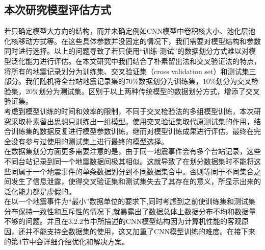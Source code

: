 \subsection{本次研究模型评估方式}
\indent 若只确定模型大方向的结构，而并未确定例如CNN模型中卷积核大小、池化层池化核移动方式等。在这些具体参数并没固定的情况下，我们需要对模型结构和参数同时进行选择。以上的问题导致了若只使用“训练-测试”的数据划分方式难以对模型泛化能力进行评估。在本文研究中我们结合了朴素留出法和交叉验证法的特点，将所有的地震记录划分为训练集、交叉验证集（cross validation set）和测试集三部分。我们随机将全台站地震记录集的70\%数据划分为训练集，10\%划分为交叉检验集，20\%划分为测试集。区别于以上两种传统模型的数据划分方式，增添了交叉验证集。\\
\indent 考虑到模型训练的时间和效率的限制，不同于交叉检验法的多组模型训练，本次研究采取朴素留出思想只训练出一组模型。使用交叉验证集取代原测试集的作用，结合训练集的数据反复进行模型参数训练，继而对模型训练成果进行评估，最终在完全没有参与过使用的测试集上进行最终的模型选择。\\
\indent 在数据集划分方面更多需要注意的是，由于同一地震事件会有多个台站记录，这些不同台站记录到同一个地震数据间极其相似。这就导致了在划分数据集时不能将这些同属于一个地震事件的单条数据划分到不同数据集合中。否则等同于不同集合之间发生了信息泄露，使得交叉验证集和测试集失去了其存在的意义，所显示出来的泛化能力都是虚假的。\\
\indent 在以一个地震事件为“最小”数据单位的要求下,同时考虑到之前使训练集和测试集分布保持一致性和互斥性的情况下,就暴露出了数据总体上数据分布不均和数据量不够的问题。并且在3.2.2节中所描述的CNN模型结构因为计算机性能的客观原因，还并不能支持全数据集的使用，这又加重了CNN模型训练的难度。在接下来的第4节中会详细介绍优化和解决方案。\\